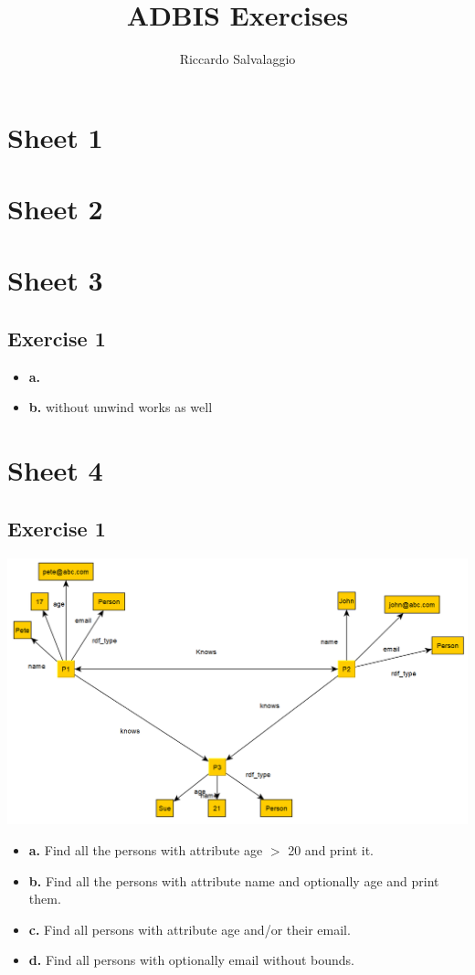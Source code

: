 \documentclass{article}
\author{Riccardo Salvalaggio}
\title{ADBIS Exercises}
\begin{document}
\maketitle
\newpage
\tableofcontents
\newpage


\section{Sheet 1}
\section{Sheet 2}
\section{Sheet 3}
\subsection{Exercise 1}
\begin{itemize}
\item \textbf{a. }
\item \textbf{b. }
without unwind works as well

\end{itemize}

\section{Sheet 4}
\subsection{Exercise 1}
\includegraphics[scale=0.6]{RDF_DB.png}
\begin{itemize}
\item \textbf{a. }Find all the persons with attribute age $>$ 20 and print it.
\item \textbf{b. }Find all the persons with attribute name  and optionally age and print them.
\item \textbf{c. }Find all persons with attribute age and/or their email.
\item \textbf{d. }Find all persons with optionally email without bounds.
\end{itemize}
\end{document}
